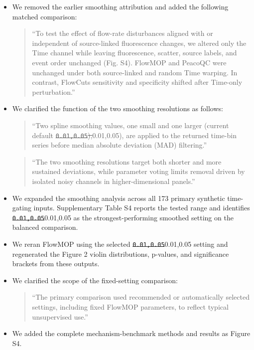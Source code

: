 \documentclass[
  11pt,
  a4paper,
]{article}
\begin{document}
\begin{itemize}
\item
  We removed the earlier smoothing attribution and added the following
  matched comparison:

  \begin{quote}
  ``To test the effect of flow-rate disturbances aligned with or
  independent of source-linked fluorescence changes, we altered only the
  Time channel while leaving fluorescence, scatter, source labels, and
  event order unchanged (Fig. S4). FlowMOP and PeacoQC were unchanged
  under both source-linked and random Time warping. In contrast,
  FlowCut\textquotesingle s sensitivity and specificity shifted after
  Time-only perturbation.''
  \end{quote}
\item
  We clarified the function of the two smoothing resolutions as follows:

  \begin{quote}
  ``Two spline smoothing values, one small and one larger (current
  default
  {\color{revisionred}\sout{\texttt{0.01,0.05}),}}{\color{revisionblue}0.01,0.05),}
  are applied to the returned time-bin series before median absolute
  deviation (MAD) filtering.''
  \end{quote}

  \begin{quote}
  ``The two smoothing resolutions target both shorter and more sustained
  deviations, while parameter voting limits removal driven by isolated
  noisy channels in higher-dimensional panels.''
  \end{quote}
\item
  We expanded the smoothing analysis across all 173 primary synthetic
  time-gating inputs. Supplementary Table S4 reports the tested range
  and identifies
  {\color{revisionred}\sout{\texttt{0.01,0.05}}}{\color{revisionblue}0.01,0.05}
  as the strongest-performing smoothed setting on the balanced
  comparison.
\item
  We reran FlowMOP using the selected
  {\color{revisionred}\sout{\texttt{0.01,0.05}}}{\color{revisionblue}0.01,0.05}
  setting and regenerated the Figure 2 violin distributions, p-values,
  and significance brackets from these outputs.
\item
  We clarified the scope of the fixed-setting comparison:

  \begin{quote}
  ``The primary comparison used recommended or automatically selected
  settings, including fixed FlowMOP parameters, to reflect typical
  unsupervised use.''
  \end{quote}
\item
  We added the complete mechanism-benchmark methods and results as
  Figure S4.
\end{itemize}
\end{document}
